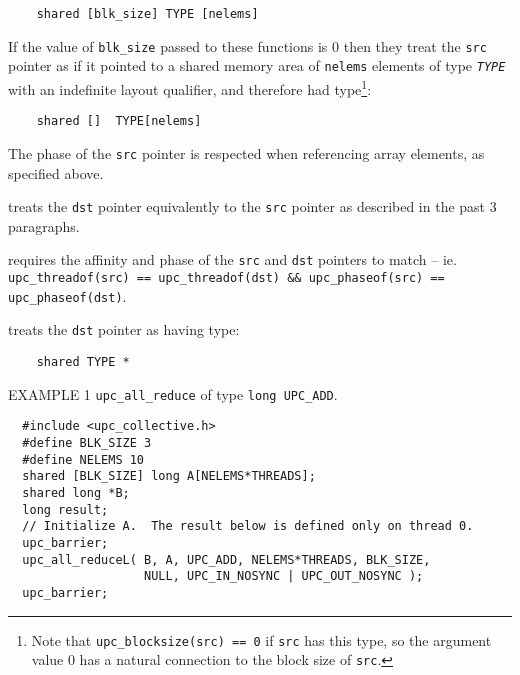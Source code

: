 \begin{verbatim}
    shared [blk_size] TYPE [nelems]
\end{verbatim}

\np
If the value of {\tt blk\_size} passed to these functions is
0 then they treat the {\tt src} pointer
as if it pointed to a shared memory area of {\tt nelems} elements of
type {\tt{\em TYPE}} with an indefinite layout qualifier, and
therefore had
type\footnote{Note that {\tt upc\_blocksize(src) == 0} if
{\tt src} has this type, so the argument value 0 has a natural
connection to the block size of {\tt src}.}:

\begin{verbatim}
    shared []  TYPE[nelems]
\end{verbatim}

\np The phase of the {\tt src} pointer is respected when
referencing array elements, as specified above.

 treats the {\tt dst} pointer
    equivalently to the {\tt src} pointer as described in the past 3
    paragraphs.
    
 requires the affinity and
phase of the {\tt src} and {\tt dst} pointers to match -- ie. 
{\tt upc\_threadof(src) == upc\_threadof(dst) \&\& upc\_phaseof(src) == upc\_phaseof(dst)}.

 treats the {\tt dst} pointer as having type:

\begin{verbatim}
    shared TYPE *
\end{verbatim}

\np EXAMPLE 1 {\tt upc\_all\_reduce} of type {\tt long UPC\_ADD}.
\begin{verbatim}
  #include <upc_collective.h>
  #define BLK_SIZE 3
  #define NELEMS 10
  shared [BLK_SIZE] long A[NELEMS*THREADS];
  shared long *B;
  long result;
  // Initialize A.  The result below is defined only on thread 0.
  upc_barrier;
  upc_all_reduceL( B, A, UPC_ADD, NELEMS*THREADS, BLK_SIZE,
                   NULL, UPC_IN_NOSYNC | UPC_OUT_NOSYNC );
  upc_barrier;
\end{verbatim}

